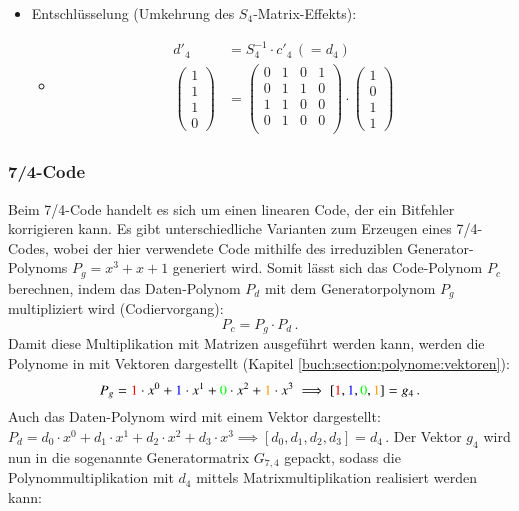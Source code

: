 \begin{itemize}
\begin{itemize}
    \end{itemize}
    \item Entschlüsselung (Umkehrung des $S_4$-Matrix-Effekts):
    \begin{itemize}
        \item[]
        \begin{align*}
            d'_{4}&=S_{4}^{-1} \cdot c'_4 \,(= d_4)\\
            \begin{pmatrix}
                1\\
                1\\
                1\\
                0
            \end{pmatrix}
            &=
            \begin{pmatrix} %
                0 & 1 & 0 & 1\\
                0 & 1 & 1 & 0\\
                1 & 1 & 0 & 0\\
                0 & 1 & 0 & 0\\
            \end{pmatrix}
            \cdot
            \begin{pmatrix} %
                1\\
                0\\
                1\\
                1
            \end{pmatrix}
        \end{align*}
    \end{itemize}
\end{itemize}


\subsubsection{7/4-Code}
Beim 7/4-Code handelt es sich um einen linearen Code,
der ein Bitfehler korrigieren kann.
Es gibt unterschiedliche Varianten zum Erzeugen eines 7/4-Codes,
wobei der hier verwendete Code mithilfe des irreduziblen Generator-Polynoms $P_g = x^3 +x + 1$ generiert wird.
Somit lässt sich das Code-Polynom $P_c$ berechnen, indem das Daten-Polynom $P_d$ mit dem Generatorpolynom $P_g$ multipliziert wird (Codiervorgang):
\[
    P_c=P_g \cdot P_d\,.
\]
Damit diese Multiplikation mit Matrizen ausgeführt werden kann, werden die Polynome in mit Vektoren dargestellt (Kapitel \ref{buch:section:polynome:vektoren}):
\[
    P_g = \textcolor{red}{1}\cdot x^0 + \textcolor{blue}{1}\cdot x^1 + \textcolor{green}{0}\cdot x^2 + \textcolor{orange}{1}\cdot x^3 \implies
    [\textcolor{red}{1}, \textcolor{blue}{1} ,\textcolor{green}{0}, \textcolor{orange}{1}] = g_4\,.
\]
Auch das Daten-Polynom wird mit einem Vektor dargestellt: $P_d = d_0 \cdot x^0 + d_1 \cdot x^1 + d_2 \cdot x^2 + d_3 \cdot x^3 \implies [d_0, d_1, d_2, d_3] = d_4$\,.
Der Vektor $g_4$ wird nun in die sogenannte Generatormatrix $G_{7,4}$ gepackt,
sodass die Polynommultiplikation mit $d_4$ mittels Matrixmultiplikation realisiert werden kann:

